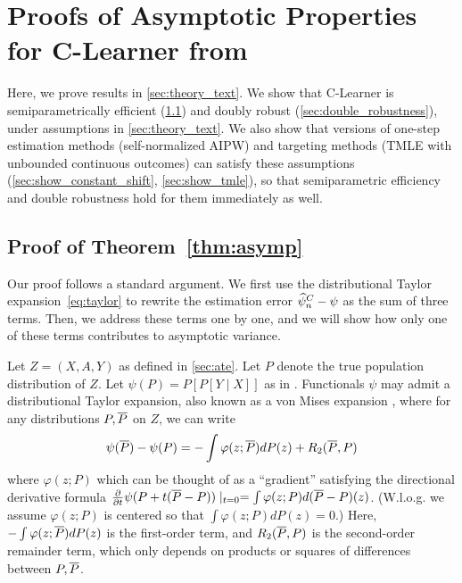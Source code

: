 \section{Proofs of Asymptotic Properties for C-Learner from }
\label{sec:theory_appendix}
Here, we prove results in \cref{sec:theory_text}. 
We show that C-Learner is semiparametrically efficient (\cref{sec:asymptotics}) and doubly robust (\cref{sec:double_robustness}), under assumptions in \cref{sec:theory_text}. 
We also show that versions of one-step estimation methods (self-normalized AIPW) and targeting methods (TMLE with unbounded continuous outcomes) can satisfy these assumptions (\cref{sec:show_constant_shift}, \cref{sec:show_tmle}), so that semiparametric efficiency and double robustness hold for them immediately as well. 

\subsection{Proof of Theorem~\ref{thm:asymp}}
\label{sec:asymptotics}









Our proof follows a standard argument. We first use the distributional Taylor expansion~\eqref{eq:taylor} to rewrite the estimation error $\widehat{\psi}_n^C-\psi$ as the sum of three terms. Then, we address these terms one by one, and we will show how only one of these terms contributes to asymptotic variance. 

Let $Z=(X,A,Y)$ as defined in \cref{sec:ate}. Let $P$ denote the true population distribution of $Z$. 
Let $\psi(P)=P[P[Y\mid X]]$ as in .
Functionals $\psi$ may admit a distributional Taylor expansion, also known as a von Mises expansion \citep{fernholz2012mises}, where for any distributions $P,\overline{P}$ on $Z$, we can write
\begin{align}
\label{eq:taylor}
    \psi(\overline{P})-\psi(P)=-\int \varphi(z;\overline{P})dP(z)+R_2(\overline{P}, P)
\end{align}
where 
$\varphi(z;P)$ which can be thought of as a ``gradient'' satisfying the directional derivative formula 
$\frac{\partial}{\partial t}\psi(P+t(\overline{P}-P))\mid_{t=0}=\int \varphi(z;P)d(\overline{P}-P)(z)$. (W.l.o.g. we assume $\varphi(z;P)$ is centered so that
$\int \varphi(z;P)dP(z)=0$.)
Here, $-\int \varphi(z;\overline{P})dP(z)$ is the first-order term, and $R_2(\overline{P}, P)$
is the second-order remainder term, which only depends on products or squares of differences between $P,\overline{P}$.

